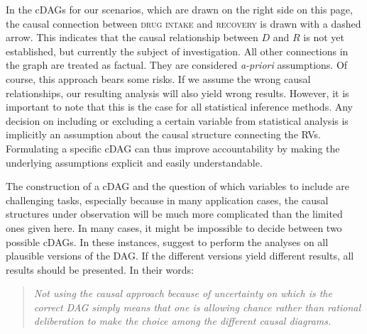 \documentclass[nobib]{tufte-handout}
\begin{document}
In the cDAGs for our scenarios, which are drawn on the right side on this page, the causal connection between \textsc{drug intake} and \textsc{recovery} is drawn with a dashed arrow.
This indicates that the causal relationship between $D$ and $R$ is not yet established, but currently the subject of investigation.
All other connections in the graph are treated as factual.
They are considered \textit{a-priori} assumptions. 
Of course, this approach bears some risks.
If we assume the wrong causal relationships, our resulting analysis will also yield wrong results.
However, it is important to note that this is the case for all statistical inference methods.
Any decision on including or excluding a certain variable from statistical analysis is implicitly an assumption about the causal structure connecting the RVs.
Formulating a specific cDAG can thus improve accountability by making the underlying assumptions explicit and easily understandable.

The construction of a cDAG and the question of which variables to include are challenging tasks, especially because in many application cases, the causal structures under observation will be much more complicated than the limited ones given here.
In many cases, it might be impossible to decide between two possible cDAGs.
In these instances, \citet{shrier2008reducing} suggest to perform the analyses on all plausible versions of the DAG.
If the different versions yield different results, all results should be presented. 
In their words: 
\begin{quote}
\emph{
Not using the causal approach because of uncertainty on which is the correct DAG simply means that one is allowing chance rather than rational deliberation to make the choice among the different causal diagrams.    
}
\end{quote}
\end{document}
